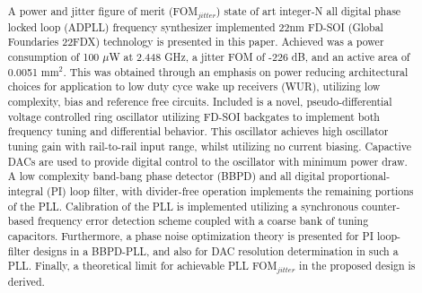 

\pagestyle{fancy}
\fancyhf{}
\fancyhead[LE,RO]{\fontfamily{\sfdefault}\selectfont \textbf{\rightmark}}
\title{\textbf{}}
\date{}

\sloppy\RaggedRight\raggedbottom
	
	
	\pagebreak

	\justify
	\setcounter{page}{1}
	\thispagestyle{nohdr}
	\large\fontfamily{\sfdefault}\selectfont \		
	\begin{abstract} \large\fontfamily{\rmdefault}\selectfont \
		
		\vspace{-2em}A power and jitter figure of merit (FOM$_{jitter}$) state of art integer-N all digital phase locked loop (ADPLL) frequency synthesizer implemented 22nm FD-SOI (Global Foundaries 22FDX) technology is presented in this paper. Achieved was a power consumption of 100 $\mu$W at 2.448 GHz, a jitter FOM of -226 dB, and an active area of 0.0051 mm$^2$. This was obtained through an emphasis on power reducing architectural choices for application to low duty cyce wake up receivers (WUR), utilizing low complexity, bias and reference free circuits. Included is a novel, pseudo-differential voltage controlled ring oscillator utilizing FD-SOI backgates to implement both frequency tuning and differential behavior. This oscillator achieves high oscillator tuning gain with rail-to-rail input range, whilst utilizing no current biasing. Capactive DACs are used to provide digital control to the oscillator with minimum power draw. A low complexity band-bang phase detector (BBPD) and all digital proportional-integral (PI) loop filter, with divider-free operation implements the remaining portions of the PLL. Calibration of the PLL is implemented utilizing a synchronous counter-based frequency error detection scheme coupled with a coarse bank of tuning capacitors. Furthermore, a phase noise optimization theory is presented for PI loop-filter designs in a BBPD-PLL, and also for DAC resolution determination in such a PLL. Finally, a theoretical limit for achievable PLL FOM$_{jitter}$ in the proposed design is derived.
	\end{abstract}

